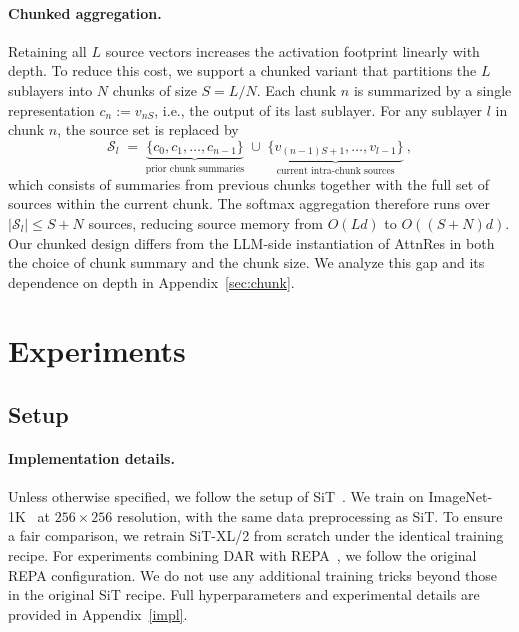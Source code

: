 \documentclass{llmxive}
\begin{document}
\paragraph{Chunked aggregation.} Retaining all $L$ source vectors increases the activation footprint linearly with depth. To reduce this cost, we support a chunked variant that partitions the $L$ sublayers into $N$ chunks of size $S = L/N$. Each chunk $n$ is summarized by a single representation $c_n := v_{nS}$, i.e., the output of its last sublayer. For any sublayer $l$ in chunk $n$, the source set is replaced by
\begin{equation}
\mathcal{S}_l \;=\; \underbrace{\{c_0, c_1, \ldots, c_{n-1}\}}_{\text{prior chunk summaries}} \;\cup\; \underbrace{\{v_{(n-1)S+1}, \ldots, v_{l-1}\}}_{\text{current intra-chunk sources}} \ ,
\end{equation}
which consists of summaries from previous chunks together with the full set of sources within the current chunk. The softmax aggregation therefore runs over $|\mathcal{S}_l| \le S + N$ sources, reducing source memory from $O(Ld)$ to $O((S + N)d)$. Our chunked design differs from the LLM-side instantiation of AttnRes in both the choice of chunk summary and the chunk size. We analyze this gap and its dependence on depth in Appendix~\ref{sec:chunk}.


\section{Experiments}   \label{sec:experiment}

\subsection{Setup}

\paragraph{Implementation details.} Unless otherwise specified, we follow the setup of SiT~\citep{ma2024sit}. We train on ImageNet-1K~\citep{russakovsky2015imagenet} at $256 \times 256$ resolution, with the same data preprocessing as SiT. To ensure a fair comparison, we retrain SiT-XL/2 from scratch under the identical training recipe. For experiments combining DAR with REPA~\citep{yu2025repa}, we follow the original REPA configuration. We do not use any additional training tricks beyond those in the original SiT recipe. Full hyperparameters and experimental details are provided in Appendix~\ref{impl}.
\end{document}
